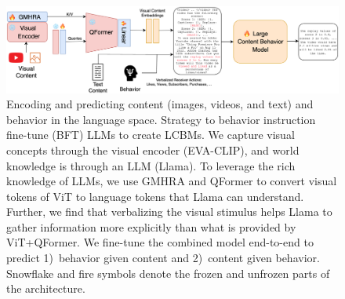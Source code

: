 \begin{landscape}
\begin{figure}
\centering
    \includegraphics[width=1.5\textwidth]{images/content-behavior-arch.pdf}
    \caption{Encoding and predicting content (images, videos, and text) and behavior in the language space. Strategy to behavior instruction fine-tune (BFT) LLMs to create LCBMs. We capture visual concepts through the visual encoder (EVA-CLIP), and world knowledge is through an LLM (Llama). To leverage the rich knowledge of LLMs, we use GMHRA and QFormer to convert visual tokens of ViT to language tokens that Llama can understand. Further, we find that verbalizing the visual stimulus helps Llama to gather information more explicitly than what is provided by ViT+QFormer. We fine-tune the combined model end-to-end to predict 1)~behavior given content and 2)~content given behavior. Snowflake and fire symbols denote the frozen and unfrozen parts of the architecture. }
    \label{fig:lcbm-architecture}
\end{figure}
\end{landscape}




